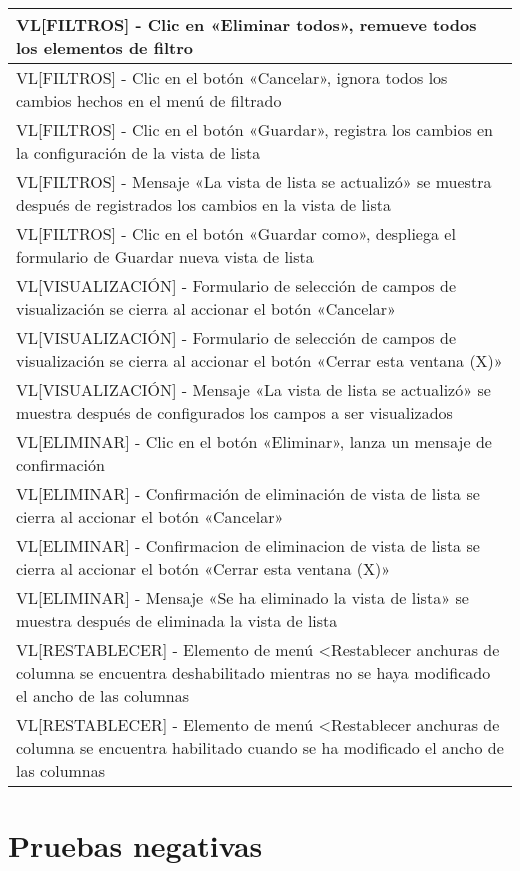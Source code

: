 \begin{longtable}{|p{15.0cm}|}
VL[FILTROS] - Clic en «Eliminar todos», remueve todos los elementos de filtro \\ \hline
VL[FILTROS] - Clic en el botón «Cancelar», ignora todos los cambios hechos en el menú de filtrado \\ \hline
VL[FILTROS] - Clic en el botón «Guardar», registra los cambios en la configuración de la vista de lista \\ \hline
VL[FILTROS] - Mensaje «La vista de lista se actualizó» se muestra después de registrados los cambios en la vista de lista \\ \hline
VL[FILTROS] - Clic en el botón «Guardar como», despliega el formulario de Guardar nueva vista de lista \\ \hline
VL[VISUALIZACIÓN] - Formulario de selección de campos de visualización se cierra al accionar el botón «Cancelar» \\ \hline
VL[VISUALIZACIÓN] - Formulario de selección de campos de visualización se cierra al accionar el botón «Cerrar esta ventana (X)» \\ \hline
VL[VISUALIZACIÓN] - Mensaje «La vista de lista se actualizó» se muestra después de configurados los campos a ser visualizados \\ \hline
VL[ELIMINAR] - Clic en el botón «Eliminar», lanza un mensaje de confirmación \\ \hline
VL[ELIMINAR] - Confirmación de eliminación de vista de lista se cierra al accionar el botón «Cancelar» \\ \hline
VL[ELIMINAR] - Confirmacion de eliminacion de vista de lista se cierra al accionar el botón «Cerrar esta ventana (X)» \\ \hline
VL[ELIMINAR] - Mensaje «Se ha eliminado la vista de lista» se muestra después de eliminada la vista de lista \\ \hline
VL[RESTABLECER] - Elemento de menú <Restablecer anchuras de columna se encuentra deshabilitado mientras no se haya modificado el ancho de las columnas \\ \hline
VL[RESTABLECER] - Elemento de menú <Restablecer anchuras de columna se encuentra habilitado cuando se ha modificado el ancho de las columnas \\ \hline
\end{longtable}

\section{Pruebas negativas}

